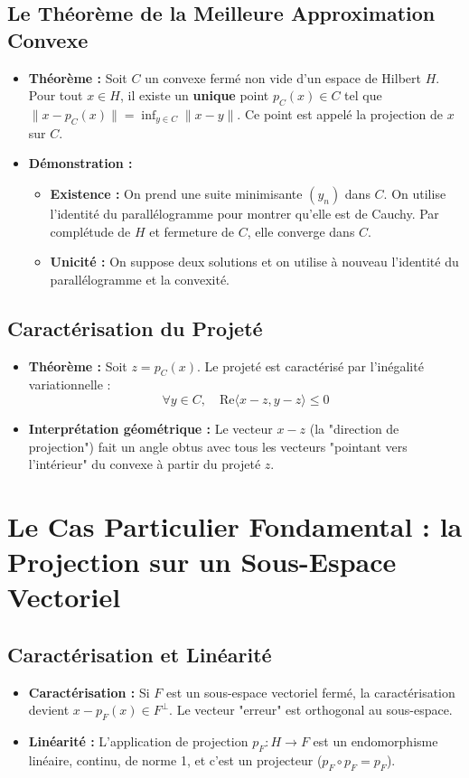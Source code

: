\documentclass[12pt, a4paper, parskip=full]{report}
\theoremstyle{agregstyle}
\begin{document}
\subsection{Le Théorème de la Meilleure Approximation Convexe}
\begin{itemize}
    \item \textbf{Théorème :} Soit $C$ un convexe fermé non vide d'un espace de Hilbert $H$. Pour tout $x \in H$, il existe un \textbf{unique} point $p_C(x) \in C$ tel que $\|x - p_C(x)\| = \inf_{y \in C} \|x - y\|$. Ce point est appelé la projection de $x$ sur $C$.
    \item \textbf{Démonstration :}
        \begin{itemize}
            \item \textbf{Existence :} On prend une suite minimisante $(y_n)$ dans $C$. On utilise l'identité du parallélogramme pour montrer qu'elle est de Cauchy. Par complétude de $H$ et fermeture de $C$, elle converge dans $C$.
            \item \textbf{Unicité :} On suppose deux solutions et on utilise à nouveau l'identité du parallélogramme et la convexité.
        \end{itemize}
\end{itemize}
\subsection{Caractérisation du Projeté}
\begin{itemize}
    \item \textbf{Théorème :} Soit $z = p_C(x)$. Le projeté est caractérisé par l'inégalité variationnelle :
    $$ \forall y \in C, \quad \mathrm{Re}\langle x-z, y-z \rangle \le 0 $$
    \item \textbf{Interprétation géométrique :} Le vecteur $x-z$ (la "direction de projection") fait un angle obtus avec tous les vecteurs "pointant vers l'intérieur" du convexe à partir du projeté $z$.
\end{itemize}

\section{Le Cas Particulier Fondamental : la Projection sur un Sous-Espace Vectoriel}
\subsection{Caractérisation et Linéarité}
\begin{itemize}
    \item \textbf{Caractérisation :} Si $F$ est un sous-espace vectoriel fermé, la caractérisation devient $x-p_F(x) \in F^\perp$. Le vecteur "erreur" est orthogonal au sous-espace.
    \item \textbf{Linéarité :} L'application de projection $p_F: H \to F$ est un endomorphisme linéaire, continu, de norme 1, et c'est un projecteur ($p_F \circ p_F = p_F$).
\end{itemize}
\end{document}

